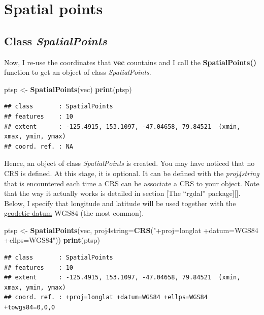 \documentclass[]{report}
\newenvironment{Shaded}{\begin{snugshade}}{\end{snugshade}}
\newcommand{\KeywordTok}[1]{\textcolor[rgb]{0.13,0.29,0.53}{\textbf{{#1}}}}
\newcommand{\DataTypeTok}[1]{\textcolor[rgb]{0.13,0.29,0.53}{{#1}}}
\newcommand{\StringTok}[1]{\textcolor[rgb]{0.31,0.60,0.02}{{#1}}}
\newcommand{\NormalTok}[1]{{#1}}
\begin{document}
\section{Spatial points}\label{spatial-points}

\subsection{\texorpdfstring{Class
\emph{SpatialPoints}}{Class SpatialPoints}}\label{class-spatialpoints}

Now, I re-use the coordinates that \textbf{vec} countains and I call the
\textbf{SpatialPoints()} function to get an object of class
\emph{SpatialPoints}.

\begin{Shaded}
\begin{Highlighting}[]
\NormalTok{ptsp <-}\StringTok{ }\KeywordTok{SpatialPoints}\NormalTok{(vec)}
\KeywordTok{print}\NormalTok{(ptsp)}
\end{Highlighting}
\end{Shaded}

\begin{verbatim}
## class       : SpatialPoints 
## features    : 10 
## extent      : -125.4915, 153.1097, -47.04658, 79.84521  (xmin, xmax, ymin, ymax)
## coord. ref. : NA
\end{verbatim}

Hence, an object of class \emph{SpatialPoints} is created. You may have
noticed that no CRS is defined. At this stage, it is optional. It can be
defined with the \emph{proj4string} that is encountered each time a CRS
can be associate a CRS to your object. Note that the way it actually
works is detailed in section {[}The ``rgdal'' package{]}{[}{]}. Below, I
specify that longitude and latitude will be used together with the
\href{http://en.wikipedia.org/wiki/Geodetic_datum}{geodetic datum} WGS84
(the most common).

\begin{Shaded}
\begin{Highlighting}[]
\NormalTok{ptsp <-}\StringTok{ }\KeywordTok{SpatialPoints}\NormalTok{(vec, }\DataTypeTok{proj4string=}\KeywordTok{CRS}\NormalTok{(}\StringTok{"+proj=longlat +datum=WGS84 +ellps=WGS84"}\NormalTok{))}
\KeywordTok{print}\NormalTok{(ptsp)}
\end{Highlighting}
\end{Shaded}

\begin{verbatim}
## class       : SpatialPoints 
## features    : 10 
## extent      : -125.4915, 153.1097, -47.04658, 79.84521  (xmin, xmax, ymin, ymax)
## coord. ref. : +proj=longlat +datum=WGS84 +ellps=WGS84 +towgs84=0,0,0
\end{verbatim}
\end{document}
